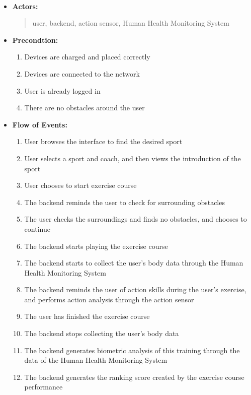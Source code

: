 \documentclass[a4paper]{article}
\begin{document}
	\hspace*{\fill}\\

	\begin{itemize}
		\item[] \textbf{Actors:}
		\begin{quote}
			user, backend, action sensor, Human Health Monitoring System
		\end{quote}
		\item[] \textbf{Precondtion:}
		\begin{enumerate}[itemindent=1em]
			\item Devices are charged and placed correctly
			\item Devices are connected to the network
			\item User is already logged in
			\item There are no obstacles around the user
		\end{enumerate}
		\item[] \textbf{Flow of Events:}
		\begin{enumerate}[itemindent=1em]
			\item User browses the interface to find the desired sport
			\item User selects a sport and coach, and then views the introduction of the sport
			\item User chooses to start exercise course
			\item The backend reminds the user to check for surrounding obstacles
			\item The user checks the surroundings and finds no obstacles, and chooses to continue
			\item The backend starts playing the exercise course
			\item The backend starts to collect the user's body data through the Human Health Monitoring System
			\item The backend reminds the user of action skills during the user's exercise, and performs action analysis through the action sensor
			\item The user has finished the exercise course
			\item The backend stops collecting the user's body data
			\item The backend generates biometric analysis of this training through the data of the Human Health Monitoring System
			\item The backend generates the ranking score created by the exercise course performance

\end{enumerate}
\end{itemize}
\end{document}
